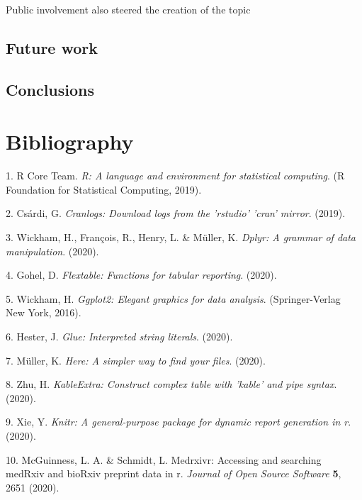 \documentclass[a4paper, twoside]{templates/ociamthesis}
\begin{document}
Public involvement also steered the creation of the topic

\hypertarget{future-work}{%
\section{Future work}\label{future-work}}

\hypertarget{conclusions}{%
\section{Conclusions}\label{conclusions}}

\hypertarget{bibliography}{%
\chapter{Bibliography}\label{bibliography}}

\hypertarget{refs}{}
\leavevmode\hypertarget{ref-base}{}%
1. R Core Team. \emph{R: A language and environment for statistical computing}. (R Foundation for Statistical Computing, 2019).

\leavevmode\hypertarget{ref-cranlogs}{}%
2. Csárdi, G. \emph{Cranlogs: Download logs from the 'rstudio' 'cran' mirror}. (2019).

\leavevmode\hypertarget{ref-dplyr}{}%
3. Wickham, H., François, R., Henry, L. \& Müller, K. \emph{Dplyr: A grammar of data manipulation}. (2020).

\leavevmode\hypertarget{ref-flextable}{}%
4. Gohel, D. \emph{Flextable: Functions for tabular reporting}. (2020).

\leavevmode\hypertarget{ref-ggplot2}{}%
5. Wickham, H. \emph{Ggplot2: Elegant graphics for data analysis}. (Springer-Verlag New York, 2016).

\leavevmode\hypertarget{ref-glue}{}%
6. Hester, J. \emph{Glue: Interpreted string literals}. (2020).

\leavevmode\hypertarget{ref-here}{}%
7. Müller, K. \emph{Here: A simpler way to find your files}. (2020).

\leavevmode\hypertarget{ref-kableExtra}{}%
8. Zhu, H. \emph{KableExtra: Construct complex table with 'kable' and pipe syntax}. (2020).

\leavevmode\hypertarget{ref-knitr}{}%
9. Xie, Y. \emph{Knitr: A general-purpose package for dynamic report generation in r}. (2020).

\leavevmode\hypertarget{ref-medrxivr}{}%
10. McGuinness, L. A. \& Schmidt, L. Medrxivr: Accessing and searching medRxiv and bioRxiv preprint data in r. \emph{Journal of Open Source Software} \textbf{5}, 2651 (2020).
\end{document}
